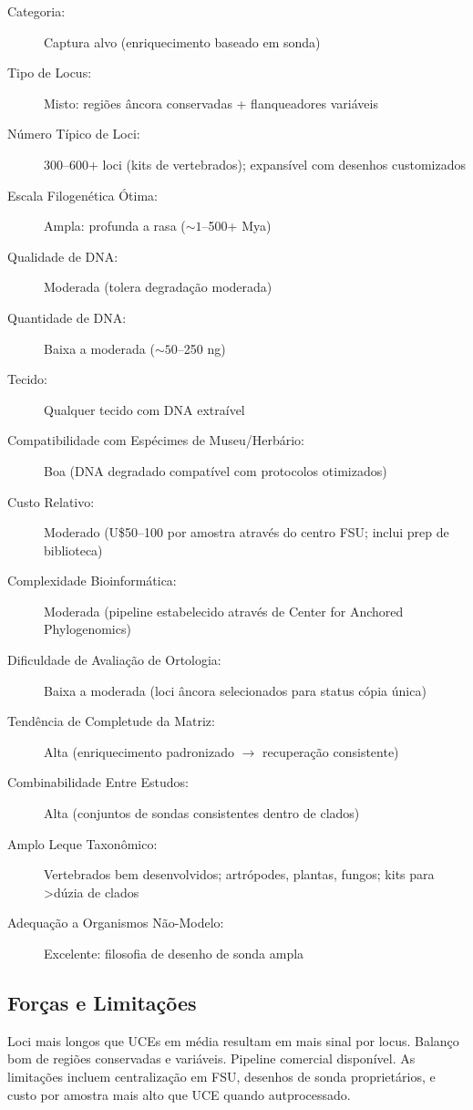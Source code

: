 \begin{description}
\item[Categoria:] Captura alvo (enriquecimento baseado em sonda)
\item[Tipo de Locus:] Misto: regiões âncora conservadas + flanqueadores variáveis
\item[Número Típico de Loci:] 300--600+ loci (kits de vertebrados); expansível com desenhos customizados
\item[Escala Filogenética Ótima:] Ampla: profunda a rasa (\(\sim 1\)--500+ Mya)
\item[Qualidade de DNA:] Moderada (tolera degradação moderada)
\item[Quantidade de DNA:] Baixa a moderada (\(\sim 50\)--250 ng)
\item[Tecido:] Qualquer tecido com DNA extraível
\item[Compatibilidade com Espécimes de Museu/Herbário:] Boa (DNA degradado compatível com protocolos otimizados)
\item[Custo Relativo:] Moderado (U\$50--100 por amostra através do centro FSU; inclui prep de biblioteca)
\item[Complexidade Bioinformática:] Moderada (pipeline estabelecido através de Center for Anchored Phylogenomics)
\item[Dificuldade de Avaliação de Ortologia:] Baixa a moderada (loci âncora selecionados para status cópia única)
\item[Tendência de Completude da Matriz:] Alta (enriquecimento padronizado $\rightarrow$ recuperação consistente)
\item[Combinabilidade Entre Estudos:] Alta (conjuntos de sondas consistentes dentro de clados)
\item[Amplo Leque Taxonômico:] Vertebrados bem desenvolvidos; artrópodes, plantas, fungos; kits para >dúzia de clados
\item[Adequação a Organismos Não-Modelo:] Excelente: filosofia de desenho de sonda ampla
\end{description}

\subsection{Forças e Limitações}

Loci mais longos que UCEs em média resultam em mais sinal por locus. Balanço bom de regiões conservadas e variáveis. Pipeline comercial disponível. As limitações incluem centralização em FSU, desenhos de sonda proprietários, e custo por amostra mais alto que UCE quando autprocessado.

